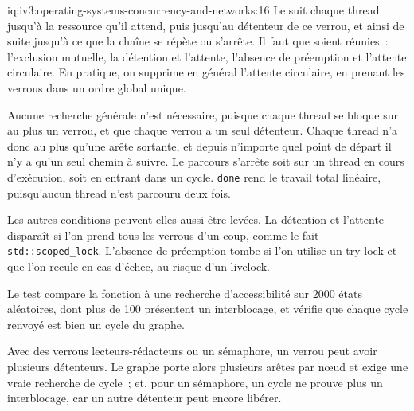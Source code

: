 \begin{solution}{iq:iv3:operating-systems-concurrency-and-networks:16}
Le  suit chaque thread jusqu'à la ressource qu'il attend, puis jusqu'au détenteur de ce verrou, et ainsi de suite jusqu'à ce que la chaîne se répète ou s'arrête. Il faut que soient réunies~: l'exclusion mutuelle, la détention et l'attente, l'absence de préemption et l'attente circulaire. En pratique, on supprime en général l'attente circulaire, en prenant les verrous dans un ordre global unique.
\enlargethispage{-2\baselineskip}%
\label{lst:iv3:os:waitfor}

Aucune recherche générale n'est nécessaire, puisque chaque thread se bloque sur au plus un verrou, et que chaque verrou a un seul détenteur. Chaque thread n'a donc au plus qu'une arête sortante, et depuis n'importe quel point de départ il n'y a qu'un seul chemin à suivre. Le parcours s'arrête soit sur un thread en cours d'exécution, soit en entrant dans un cycle. \texttt{done} rend le travail total linéaire, puisqu'aucun thread n'est parcouru deux fois.

Les autres conditions peuvent elles aussi être levées. La détention et l'attente disparaît si l'on prend tous les verrous d'un coup, comme le fait \texttt{std::scoped\_lock}. L'absence de préemption tombe si l'on utilise un try-lock et que l'on recule en cas d'échec, au risque d'un livelock.

Le test compare la fonction à une recherche d'accessibilité sur 2000 états aléatoires, dont plus de 100 présentent un interblocage, et vérifie que chaque cycle renvoyé est bien un cycle du graphe.

Avec des verrous lecteurs-rédacteurs ou un sémaphore, un verrou peut avoir plusieurs détenteurs. Le graphe porte alors plusieurs arêtes par nœud et exige une vraie recherche de cycle~; et, pour un sémaphore, un cycle ne prouve plus un interblocage, car un autre détenteur peut encore libérer.

\end{solution}

